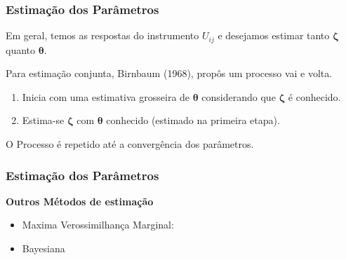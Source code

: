 \documentclass{beamer}
\begin{document}
	\begin{frame}
		
		\frametitle{Estimação dos Parâmetros }
		
		Em geral, temos as respostas do instrumento $U_{ij}$ e desejamos estimar tanto $\boldsymbol{\zeta}$ quanto $\boldsymbol{\theta}$.
		
		Para estimação conjunta, Birnbaum (1968), propôs um processo vai e volta.\newline
		
		\begin{enumerate}
			\item Inicia com uma estimativa grosseira de $\boldsymbol{\theta}$ considerando que $\boldsymbol{\zeta}$ é conhecido.
			\item Estima-se $\boldsymbol{\zeta}$ com $\boldsymbol{\theta}$ conhecido (estimado na primeira etapa).\newline 
		\end{enumerate} 
		
		O Processo é repetido até a convergência dos parâmetros.
		
	\end{frame}	
	
	
	
	\begin{frame}
		\frametitle{Estimação dos Parâmetros}
			
		\begin{center}
			\textbf{Outros Métodos de estimação}
		\end{center}
			
		
		\begin{itemize}
			\item Maxima Verossimilhança Marginal: 
			\item Bayesiana
		\end{itemize}
		
		
	\end{frame}

	

		
%					
%	
%
%		
	
\end{document}
